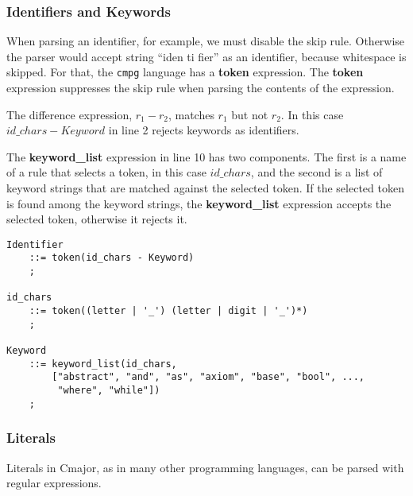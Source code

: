 \documentclass[a4paper,oneside,11pt]{book}
\theoremstyle{definition}
\begin{document}
\subsubsection{Identifiers and Keywords}

When parsing an identifier, for example, we must disable the skip rule.
Otherwise the parser would accept string ``iden ti fier'' as an identifier,
because whitespace is skipped.
For that, the \verb|cmpg| language has a \textbf{token} expression.
The \textbf{token} expression suppresses the skip rule when parsing the contents of the expression.

The difference expression, $r_1 - r_2$, matches $r_1$ but not $r_2$.
In this case $id\_chars - Keyword$ in line 2 rejects keywords as identifiers.

The \textbf{keyword\_list} expression in line 10 has two components.
The first is a name of a rule that selects a token, in this case $id\_chars$, and the
second is a list of keyword strings that are matched against the selected token.
If the selected token is found among the keyword strings,
the \textbf{keyword_list} expression accepts the selected token, otherwise it rejects it.

\begin{flushleft}
\begin{lstlisting}[language=cmpg,frame=trBL]
Identifier
    ::= token(id_chars - Keyword)
    ;

id_chars
    ::= token((letter | '_') (letter | digit | '_')*)
    ;

Keyword
    ::= keyword_list(id_chars,
        ["abstract", "and", "as", "axiom", "base", "bool", ...,
         "where", "while"])
    ;
\end{lstlisting}
\end{flushleft}

\subsubsection{Literals}

Literals in Cmajor, as in many other programming languages, can be parsed with regular expressions.
\end{document}
